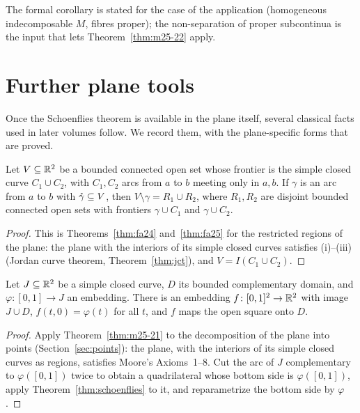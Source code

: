 The formal corollary is stated for the case of the application (homogeneous indecomposable $M$, fibres proper);
the non-separation of proper subcontinua is the input that lets Theorem~\ref{thm:m25-22} apply.

\section{Further plane tools}

Once the Schoenflies theorem is available in the plane itself, several classical facts used in later volumes
follow. We record them, with the plane-specific forms that are proved.

\begin{theorem}\label{thm:plane-split}
Let $V\subseteq\mathbb{R}^2$ be a bounded connected open set whose frontier is the simple closed curve $C_1\cup C_2$, with
$C_1,C_2$ arcs from $a$ to $b$ meeting only in $a,b$. If $\gamma$ is an arc from $a$ to $b$ with $\mathring{\gamma}\subseteq V$, then
$V\setminus\gamma=R_1\cup R_2$, where $R_1,R_2$ are disjoint bounded connected open sets with frontiers
$\gamma\cup C_1$ and $\gamma\cup C_2$.
\end{theorem}

\begin{proof}
This is Theorems~\ref{thm:fa24} and~\ref{thm:fa25} for the restricted regions of the plane: the plane with the
interiors of its simple closed curves satisfies (i)--(iii) (Jordan curve theorem, Theorem~\ref{thm:jct}), and
$V=I(C_1\cup C_2)$.
\end{proof}


\begin{theorem}\label{thm:plane-schoenflies}
Let $J\subseteq\mathbb{R}^2$ be a simple closed curve, $D$ its bounded complementary domain, and $\varphi\colon[0,1]\to J$ an
embedding. There is an embedding $f\colon[0,1]^2\to\mathbb{R}^2$ with image $J\cup D$, $f(t,0)=\varphi(t)$ for all $t$, and $f$
maps the open square onto $D$.
\end{theorem}

\begin{proof}
Apply Theorem~\ref{thm:m25-21} to the decomposition of the plane into points (Section~\ref{sec:points}): the plane,
with the interiors of its simple closed curves as regions, satisfies Moore's Axioms~1--8. Cut the arc of $J$
complementary to $\varphi([0,1])$ twice to obtain a quadrilateral whose bottom side is $\varphi([0,1])$, apply
Theorem~\ref{thm:schoenflies} to it, and reparametrize the bottom side by $\varphi$.
\end{proof}

